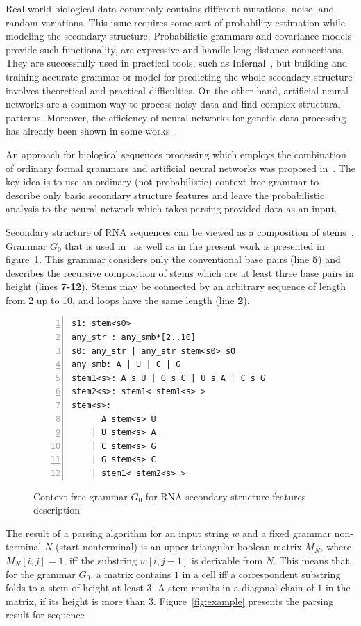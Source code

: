\documentclass[runningheads]{llncs}
\begin{document}
Real-world biological data commonly contains different mutations, noise, and random variations.
This issue requires some sort of probability estimation while modeling the secondary structure.
Probabilistic grammars and covariance models provide such functionality, are expressive and handle long-distance connections.
They are successfully used in practical tools, such as Infernal~\cite{Infernal}, but building and training accurate grammar or model for predicting the whole secondary structure involves theoretical and practical difficulties.
On the other hand, artificial neural networks are a common way to process noisy data and find complex structural patterns.
Moreover, the efficiency of neural networks for genetic data processing has already been shown in some works~\cite{Humidor,ANN}.

An approach for biological sequences processing which employs the combination of ordinary formal grammars and artificial neural networks was proposed in~\cite{grigorevcomposition}.  
The key idea is to use an ordinary (not probabilistic)  context-free grammar to describe only basic secondary structure features and leave the probabilistic analysis to the neural network which takes parsing-provided data as an input.

Secondary structure of RNA sequences can be viewed as a composition of stems~\cite{MQbioinformatics19}.
Grammar $G_0$ that is used in~\cite{grigorevcomposition} as well as in the present work is presented in figure~\ref{gram}.
This grammar considers only the conventional base pairs (line \textbf{5}) and describes the recursive composition of stems which are at least three base pairs in height (lines \textbf{7-12}). Stems may be connected by an arbitrary sequence of length from 2 up to 10, and loops have the same length (line \textbf{2}).

\begin{figure}
\begin{Verbatim}[numbers=left,xleftmargin=5mm]
s1: stem<s0>
any_str : any_smb*[2..10]
s0: any_str | any_str stem<s0> s0
any_smb: A | U | C | G
stem1<s>: A s U | G s C | U s A | C s G 
stem2<s>: stem1< stem1<s> >
stem<s>:  
      A stem<s> U 
    | U stem<s> A 
    | C stem<s> G 
    | G stem<s> C 
    | stem1< stem2<s> >  
\end{Verbatim}
\caption{Context-free grammar $G_0$ for RNA secondary structure features description}
\label{gram}
\end{figure}

The result of a parsing algorithm for an input string $w$ and a fixed grammar non-terminal $N$ (start nonterminal) is an upper-triangular boolean matrix $M_N$, where $M_N [i,j] = 1$, iff the substring $w[i,j-1]$ is derivable from $N$.
This means that, for the grammar $G_0$, a matrix contains $1$ in a cell iff a correspondent substring folds to a  stem of height at least 3.
A stem results in a diagonal chain of $1$ in the matrix, if its height is more than 3.
Figure~\ref{fig:example} presents the parsing result for sequence
\end{document}
